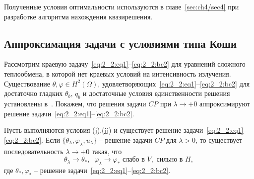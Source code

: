 Полученные условия оптимальности используются в главе~\ref{sec:ch4/sec4} при разработке алгоритма
нахождения квазирешения.

\subsection{Аппроксимация задачи с условиями типа Коши}
\label{subsec:ch2/sec2/approximation}

Рассмотрим краевую задачу~\eqref{eq:2_2:eq1}--\eqref{eq:2_2:bc2} для
уравнений сложного теплообмена, в которой нет краевых условий
на интенсивность излучения.
Существование $\theta,\varphi\in H^2(\Omega)$,
удовлетворяющих~\eqref{eq:2_2:eq1}--\eqref{eq:2_2:bc2} для достаточно гладких
$\theta_b,\, q_b$ и достаточные условия единственности решения
установлены в~\cite{CMMP20}.
Покажем, что решения задачи $CP$ при $\lambda\to+0$
аппроксимируют решение задачи~\eqref{eq:2_2:eq1}--\eqref{eq:2_2:bc2}.


\begin{theorem}
    \label{th:2_2:3}
    Пусть выполняются условия (j),(jj) и существует решение
    задачи~\eqref{eq:2_2:eq1}--\eqref{eq:2_2:bc2}.
    Если $\{\theta_\lambda,\varphi_\lambda,u_\lambda\}$ -- решение
    задачи $CP$ для $\lambda>0$, то существует последовательность $\lambda\to +0$
    такая, что
    \[
        \theta_\lambda\rightarrow\theta_*, \;\; \varphi_\lambda\rightarrow\varphi_*
        \text{ слабо в }V,\text{ сильно в }H,
    \]
    где $\theta_*,\varphi_*$ -- решение задачи~\eqref{eq:2_2:eq1}--\eqref{eq:2_2:bc2}.
\end{theorem}

